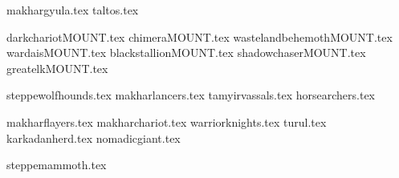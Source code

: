 
{makhargyula.tex}
{taltos.tex}

\clearpage
{}
{darkchariotMOUNT.tex}
{chimeraMOUNT.tex}
{wastelandbehemothMOUNT.tex}
{wardaisMOUNT.tex}
{blackstallionMOUNT.tex}
{shadowchaserMOUNT.tex}
{greatelkMOUNT.tex}

\clearpage
{}
{steppewolfhounds.tex}
{makharlancers.tex}
{tamyirvassals.tex}
{horsearchers.tex}



\clearpage
{}
{makharflayers.tex}
{makharchariot.tex}
{warriorknights.tex}
{turul.tex}
{karkadanherd.tex}
{nomadicgiant.tex}

\clearpage
{}
{steppemammoth.tex}

